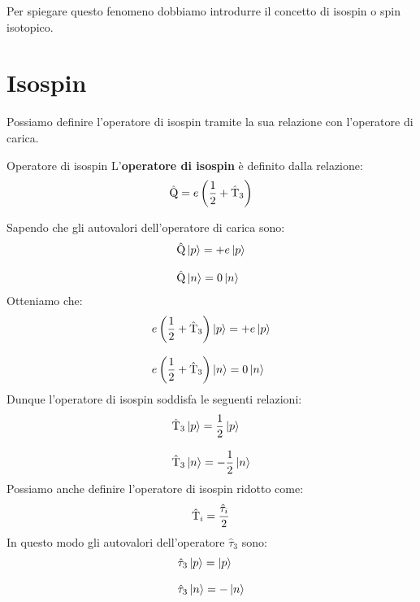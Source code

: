 
Per spiegare questo fenomeno dobbiamo introdurre il concetto di isospin o spin isotopico.\\
\section{Isospin}
Possiamo definire l'operatore di isospin tramite la sua relazione con l'operatore di carica.
\begin{definition}{Operatore di isospin}
    L'\textbf{operatore di isospin} è definito dalla relazione:
    \begin{equation}
        \hat{\text{Q}} = e \left(\dfrac{1}{2} + \hat{\text{T}}_3\right)
    \end{equation}
\end{definition}
Sapendo che gli autovalori dell'operatore di carica sono:
\begin{equation}
    \begin{split}
        &\hat{\text{Q}} \ket{p} = +e \ket{p} \\[8pt]
        &\hat{\text{Q}} \ket{n} = 0 \ket{n}
    \end{split}
\end{equation}
Otteniamo che:
\begin{equation}
    \begin{split}
    &e \left(\dfrac{1}{2} + \hat{\text{T}}_3\right) \ket{p} = +e \ket{p} \\[8pt]
    &e \left(\dfrac{1}{2} + \hat{\text{T}}_3\right) \ket{n} = 0 \ket{n}
    \end{split}
\end{equation}
Dunque l'operatore di isospin soddisfa le seguenti relazioni:
\begin{equation}
 \begin{split}
  &\hat{\text{T}}_3 \ket{p}= \dfrac{1}{2}\ket{p} \\[8pt]
  &\hat{\text{T}}_3 \ket{n}= -\dfrac{1}{2}\ket{n}
 \end{split}
\end{equation}
Possiamo anche definire l'operatore di isospin ridotto come:
\begin{equation}
 \hat{\text{T}}_i = \dfrac{\hat{\tau}_i}{2}
\end{equation}
In questo modo gli autovalori dell'operatore $\hat{\tau}_3$ sono:
\begin{equation}
 \begin{split}
  &\hat{\tau}_3 \ket{p}= \ket{p} \\[8pt]
  &\hat{\tau}_3 \ket{n}= -\ket{n}
 \end{split}
\end{equation}
